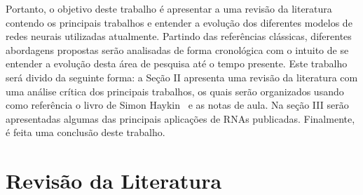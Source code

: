 \documentclass[conference]{IEEEtran}
\begin{document}
	Portanto, o objetivo deste trabalho é apresentar a uma revisão da literatura contendo os principais trabalhos e entender a evolução dos diferentes modelos de redes neurais utilizadas atualmente. Partindo das referências clássicas, diferentes abordagens propostas serão analisadas de forma cronológica com o intuito de se entender a evolução desta área de pesquisa até o tempo presente. Este trabalho será divido da seguinte forma: a Seção II apresenta uma revisão da literatura com uma análise crítica dos principais trabalhos, os quais serão organizados usando como referência o livro de Simon Haykin~\cite{haykin2007neural} e as notas de aula. Na seção III serão apresentadas algumas das principais aplicações de RNAs publicadas. Finalmente, é feita uma conclusão deste trabalho.
		
	

%
%
	
	\section{Revisão da Literatura}
	
\end{document}
